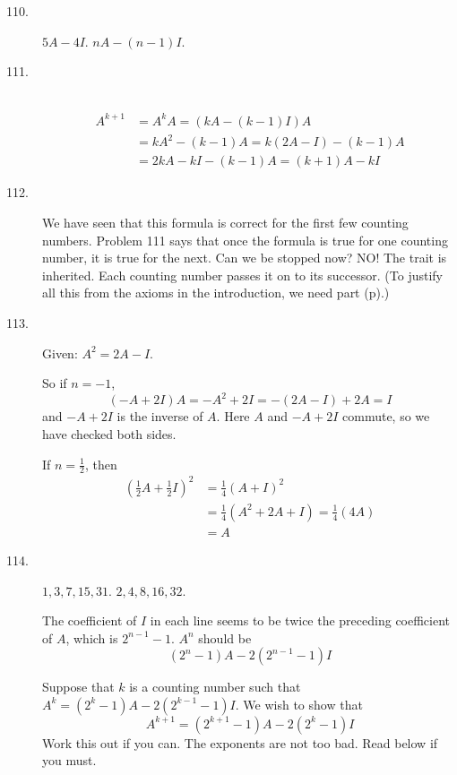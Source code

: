 \documentclass{article}
\begin{document}
\begin{description}
  \item[110.] $5A-4I$. $nA-(n-1)I$.

  \item[111.] $\ $
    \begin{align*}
    A^{k+1} & = A^k A = ( kA - (k-1)I ) A \\ 
            & = kA^2 - (k-1)A = k(2A-I) - (k-1)A \\
            & = 2kA-kI - (k-1)A= (k+1)A - kI
    \end{align*}

  \item[112.] We have seen that this formula is correct for the first few counting numbers. Problem 111 says that once the formula is true for one counting number, it is true for the next. Can we be stopped now? NO! The trait is inherited. Each counting number passes it on to its successor. (To justify all this from the axioms in the introduction, we need part (p).)

  \item[113.] Given: $A^2 = 2A-I$.

    So if $n = -1$,
    \begin{equation*}
    (-A+2I)A = -A^2+2I = -(2A-I)+2A = I
    \end{equation*}
    and $-A+2I$ is the inverse of $A$. Here $A$ and $-A+2I$ commute, so we have checked both sides.

    If $n = \frac{1}{2}$, then
    \begin{align*}
    \left( \frac{1}{2} A + \frac{1}{2} I \right) ^2 & = \frac{1}{4} (A+I)^2 \\
       & = \frac{1}{4} (A^2 + 2A + I) = \frac{1}{4} (4A) \\
       & = A
    \end{align*}

  \item[114.] $1, 3, 7, 15, 31$. $2, 4, 8, 16, 32$.

    The coefficient of $I$ in each line seems to be twice the preceding coefficient of $A$, which is $2^{n-1} - 1$. $A^n$ should be 
    \begin{equation*}
    (2^n - 1)A - 2(2^{n-1}-1)I
    \end{equation*}

    Suppose that $k$ is a counting number such that $A^k = (2^k-1)A - 2(2^{k-1}-1)I$. We wish to show that
    \begin{equation*}
    A^{k+1} = (2^{k+1}-1)A - 2(2^k-1)I
    \end{equation*}
    Work this out if you can. The exponents are not too bad. Read below if you must.


\end{description}
\end{document}
